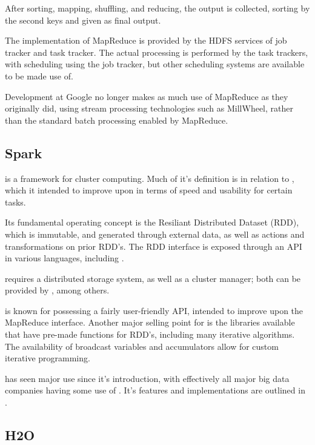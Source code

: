 After sorting, mapping, shuffling, and reducing, the output is
collected, sorting by the second keys and given as final output.

The implementation of MapReduce is provided by the HDFS services of job
tracker and task tracker. The actual processing is performed by the task
trackers, with scheduling using the job tracker, but other scheduling
systems are available to be made use of.

Development at Google no longer makes as much use of MapReduce as they
originally did, using stream processing technologies such as MillWheel,
rather than the standard batch processing enabled by
MapReduce\cite{akidau2013millwheel}.

\subsection{Spark}\label{sec:spark}

 is a framework for cluster computing\cite{zaharia2010spark}. Much
of it's definition is in relation to , which it intended to
improve upon in terms of speed and usability for certain tasks.

Its fundamental operating concept is the Resiliant Distributed Dataset
(RDD), which is immutable, and generated through external data, as well
as actions and transformations on prior RDD's. The RDD interface is
exposed through an API in various languages, including \R{}.

 requires a distributed storage system, as well as a cluster
manager; both can be provided by , among others.

 is known for possessing a fairly user-friendly API, intended to
improve upon the MapReduce interface. Another major selling point for
 is the libraries available that have pre-made functions for RDD's,
including many iterative algorithms. The availability of broadcast
variables and accumulators allow for custom iterative programming.

 has seen major use since it's introduction, with effectively all
major big data companies having some use of . It's features and
implementations are outlined in \textcite{zaharia2016apache}.

\subsection{H2O}\label{sec:h2o}

